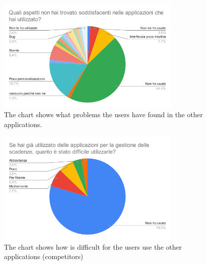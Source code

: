 \begin{figure}[htbp]
	\centering
	\includegraphics[width=0.8\textwidth]{../Draw.io diagrams/application_review.png}  %
	
	\caption{The chart shows what problems the users have found in the other applications.}
\end{figure}

\begin{figure}[H]
	\centering
	\includegraphics[width=0.8\textwidth]{../Draw.io diagrams/how_did_difficult_use_competitors.png}  %
	
	\caption{The chart shows how is difficult for the users use the other applications (competitors)}
\end{figure}
\clearpage
